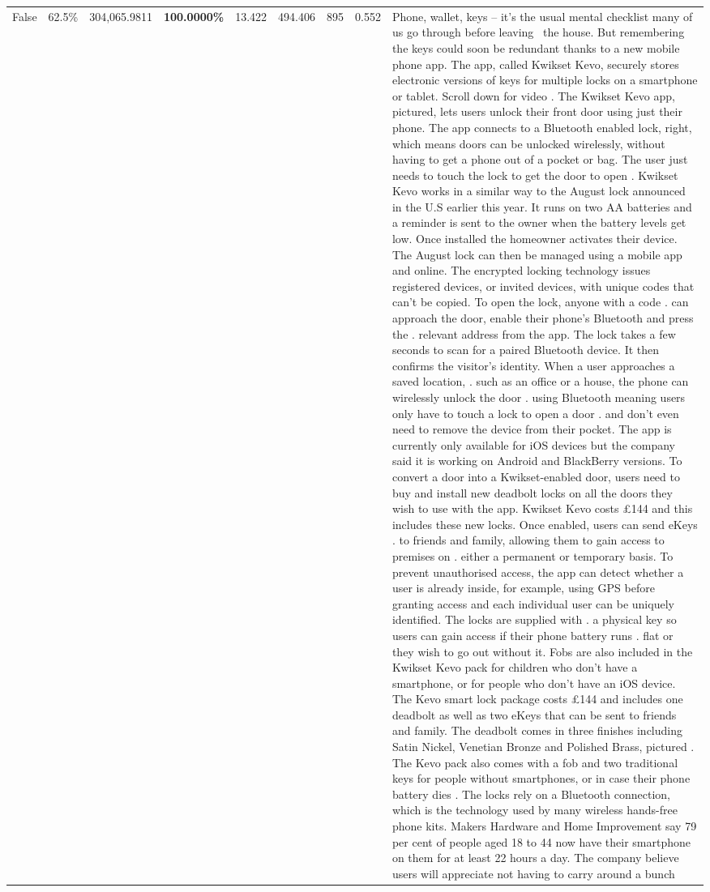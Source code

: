 \begin{table}[H]
\begin{tabular}{lllrlllll}
False & 62.5\% & 304,065.9811 & \bfseries \color{red} 100.0000\% & 13.422 & 494.406 & 895 & 0.552 & Phone, wallet, keys – it’s the usual mental checklist many of us go through before leaving  the house. But remembering the keys could soon be redundant thanks to a new mobile phone app. The app, called Kwikset Kevo, securely stores electronic versions of keys for multiple locks on a smartphone or tablet. Scroll down for video . The Kwikset Kevo app, pictured, lets users unlock their front door using just their phone. The app connects to a Bluetooth enabled lock, right, which means doors can be unlocked wirelessly, without having to get a phone out of a pocket or bag. The user just needs to touch the lock to get the door to open . Kwikset Kevo works in a similar way to the August lock announced in the U.S earlier this year. It runs on two AA batteries and a reminder is sent to the owner when the battery levels get low. Once installed the homeowner activates their device. The August lock can then be managed using a mobile app and online. The encrypted locking technology issues registered devices, or invited devices, with unique codes that can't be copied. To open the lock, anyone with a code . can approach the door, enable their phone's Bluetooth and press the . relevant address from the app. The lock takes a few seconds to scan for a paired Bluetooth device. It then confirms the visitor's identity. When a user approaches a saved location, . such as an office or a house, the phone can wirelessly unlock the door . using Bluetooth meaning users only have to touch a lock to open a door . and don't even need to remove the device from their pocket. The app is currently only available for iOS devices but the company said it is working on Android and BlackBerry versions. To convert a door into a Kwikset-enabled door, users need to buy and install new deadbolt locks on all the doors they wish to use with the app. Kwikset Kevo costs £144 and this includes these new locks. Once enabled, users can send eKeys . to friends and family, allowing them to gain access to premises on . either a permanent or temporary basis. To prevent unauthorised access, the app can detect whether a user is already inside, for example, using GPS before granting access and each individual user can be uniquely identified. The locks are supplied with . a physical key so users can gain access if their phone battery runs . flat or they wish to go out without it. Fobs are also included in the Kwikset Kevo pack for children who don't have a smartphone, or for people who don't have an iOS device. The Kevo smart lock package costs £144 and includes one deadbolt as well as two eKeys that can be sent to friends and family. The deadbolt comes in three finishes including Satin Nickel, Venetian Bronze and Polished Brass, pictured . The Kevo pack also comes with a fob and two traditional keys for people without smartphones, or in case their phone battery dies . The locks rely on a Bluetooth connection, which is the technology used by many wireless hands-free phone kits. Makers Hardware and Home Improvement say 79 per cent of people aged 18 to 44 now have their smartphone on them for at least 22 hours a day. The company believe users will appreciate not having to carry around a bunch 
\end{tabular}
\end{table}
